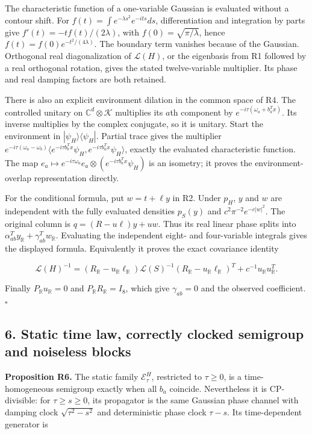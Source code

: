 \documentclass[
  11pt,
]{article}
\begin{document}
The characteristic function of a one-variable Gaussian is evaluated
without a contour shift. For \(f(t)=\int e^{-\lambda s^2}e^{-its}ds\),
differentiation and integration by parts give
\(f'(t)=-tf(t)/(2\lambda)\), with \(f(0)=\sqrt{\pi/\lambda}\), hence
\(f(t)=f(0)e^{-t^2/(4\lambda)}\). The boundary term vanishes because of
the Gaussian. Orthogonal real diagonalization of \(\mathscr L(H)\), or
the eigenbasis from R1 followed by a real orthogonal rotation, gives the
stated twelve-variable multiplier. Its phase and real damping factors
are both retained.

There is also an explicit environment dilation in the common space of
R4. The controlled unitary on \(\mathbb C^d\otimes\mathcal K\)
multiplies its \(a\)th component by \(e^{-i\tau(\omega_a+b_a^Tx)}\). Its
inverse multiplies by the complex conjugate, so it is unitary. Start the
environment in \(|\psi_H\rangle\langle\psi_H|\). Partial trace gives the
multiplier
\(e^{-i\tau(\omega_a-\omega_b)}\langle e^{-i\tau b_b^Tx}\psi_H,e^{-i\tau b_a^Tx}\psi_H\rangle\),
exactly the evaluated characteristic function. The map
\(e_a\mapsto e^{-i\tau\omega_a}e_a\otimes(e^{-i\tau b_a^Tx}\psi_H)\) is
an isometry; it proves the environment-overlap representation directly.

For the conditional formula, put \(w=t+\ell y\) in R2. Under \(p_H\),
\(y\) and \(w\) are independent with the fully evaluated densities
\(p_S(y)\) and \(c^2\pi^{-2}e^{-c|w|^2}\). The original column is
\(q=(R-u\ell)y+uw\). Thus its real linear phase splits into
\(\alpha_{ab}^Ty_{\mathbb R}+\gamma_{ab}^Tw_{\mathbb R}\). Evaluating
the independent eight- and four-variable integrals gives the displayed
formula. Equivalently it proves the exact covariance identity

\[
\mathscr L(H)^{-1}=(R_{\mathbb R}-u_{\mathbb R}\ell_{\mathbb R})
\mathscr L(S)^{-1}(R_{\mathbb R}-u_{\mathbb R}\ell_{\mathbb R})^T
+c^{-1}u_{\mathbb R}u_{\mathbb R}^T.
\]

Finally \(P_{\mathbb R}u_{\mathbb R}=0\) and
\(P_{\mathbb R}R_{\mathbb R}=I_8\), which give \(\gamma_{ab}=0\) and the
observed coefficient. \ensuremath{\square}

\subsection{6. Static time law, correctly clocked semigroup and
noiseless
blocks}\label{static-time-law-correctly-clocked-semigroup-and-noiseless-blocks}

\textbf{Proposition R6.} The static family \(\mathcal E^H_\tau\),
restricted to \(\tau\ge0\), is a time-homogeneous semigroup exactly when
all \(b_a\) coincide. Nevertheless it is CP-divisible: for
\(\tau\ge s\ge0\), its propagator is the same Gaussian phase channel
with damping clock \(\sqrt{\tau^2-s^2}\) and deterministic phase clock
\(\tau-s\). Its time-dependent generator is
\end{document}
